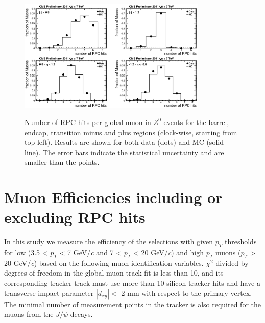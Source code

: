 \documentclass{JINST}
\begin{document}
\begin{figure}
  \begin{center}
    \texttt{\includegraphics[width=0.8\textwidth]{hitDistr_STA}}
    \caption{
    Number of RPC hits per global muon in $Z^{0}$ events for the barrel, endcap, transition minus and plus regions (clock-wise, starting from top-left). Results are shown for both data (dots) and MC (solid line). The error bars indicate the statistical uncertainty and are smaller than the points.
    }
    \label{fig:hitDistr_STA}
    \vspace{-0.4cm}
  \end{center}
\end{figure}

\section{Muon Efficiencies including or excluding RPC hits}
In this study we measure the efficiency of the selections
with given $p_T$ thresholds for low (3.5 < $p_T$ < 7 GeV/\emph{c} and 7 < $p_T$ < 20 GeV/\emph{c})
and high $p_T$ muons ($p_T$ > 20 GeV/\emph{c}) based on the following muon identification variables. $\chi^{2}$ divided by degrees of freedom in the global-muon track fit is less than 10, and its corresponding tracker track must use more than 10 silicon tracker hits
and have a transverse impact parameter $|d_{xy}| <$ 2 mm with respect to the primary vertex.
The minimal number of measurement points in the tracker is also required for the muons from the $J/\psi$ decays.
\end{document}
